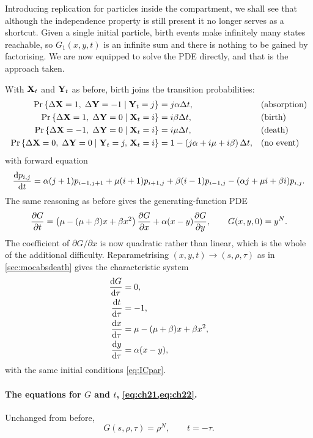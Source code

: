 Introducing replication for particles inside the compartment, we shall see that although
the independence property is still present it no longer serves as a shortcut. Given a
single initial particle, birth events make infinitely many states reachable, so
$G_1(x,y,t)$ is an infinite sum and there is nothing to be gained by factorising. We are
now equipped to solve the PDE directly, and that is the approach taken.

With ${{\bf X}_t}$ and ${{\bf Y}_t}$ as before, birth joins the transition probabilities:
\begin{align*}
{\text{Pr}\left\{\Delta{\bf X}=1,\;\Delta{\bf Y}=-1 \;|\; {{\bf Y}_t}=j\right\}} &= j\alpha\Delta t, &&\text{(absorption)}\\
{\text{Pr}\left\{\Delta{\bf X}=1,\;\Delta{\bf Y}=0 \;|\; {{\bf X}_t}=i\right\}} &= i\beta\Delta t, &&\text{(birth)}\\
{\text{Pr}\left\{\Delta{\bf X}=-1,\;\Delta{\bf Y}=0 \;|\; {{\bf X}_t}=i\right\}} &= i\mu\Delta t, &&\text{(death)}\\
{\text{Pr}\left\{\Delta{\bf X}=0,\;\Delta{\bf Y}=0 \;|\; {{\bf Y}_t}=j,\,{{\bf X}_t}=i\right\}} &= 1-\left( j\alpha+i\mu+i\beta\right)\Delta t, &&\text{(no event)}
\end{align*}
with forward equation
\begin{equation}
\label{eq:FK3}
\displaystyle\frac{{\rm d} p_{i,j}}{{\rm d} t} = \alpha(j+1)p_{i-1,j+1} + \mu(i+1)p_{i+1,j} + \beta(i-1)p_{i-1,j}
- (\alpha j+\mu i+\beta i)p_{i,j} .
\end{equation}
The same reasoning as before gives the generating-function PDE
\begin{equation}
\label{eq:PDE3}
\displaystyle\frac{\partial G}{\partial t} = \left(\mu - (\mu+\beta)x + \beta x^2\right)\displaystyle\frac{\partial G}{\partial x} + \alpha(x-y)\displaystyle\frac{\partial G}{\partial y},
\qquad G(x,y,0) = y^N .
\end{equation}
The coefficient of $\partial G/\partial x$ is now quadratic rather than linear, which is
the whole of the additional difficulty. Reparametrising $(x,y,t)\to(s,\rho,\tau)$ as in
\cref{sec:mocabsdeath} gives the characteristic system
\begin{align}
\displaystyle\frac{{\rm d} G}{{\rm d} \tau} &= 0, \label{eq:ch21}\\
\displaystyle\frac{{\rm d} t}{{\rm d} \tau} &= -1, \label{eq:ch22}\\
\displaystyle\frac{{\rm d} x}{{\rm d} \tau} &= \mu-(\mu+\beta)x+\beta x^2, \label{eq:ch23}\\
\displaystyle\frac{{\rm d} y}{{\rm d} \tau} &= \alpha(x-y), \label{eq:ch24}
\end{align}
with the same initial conditions \cref{eq:ICpar}.

\paragraph{The equations for $G$ and $t$, \cref{eq:ch21,eq:ch22}.}
Unchanged from before,
\begin{equation}
\label{eq:GrN3}
G(s,\rho,\tau) = \rho^N,
\qquad t = -\tau .
\end{equation}

